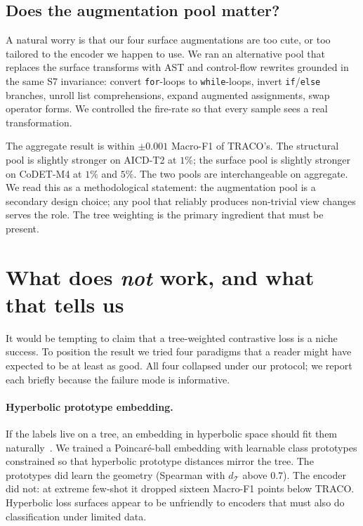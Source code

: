 ﻿\documentclass[11pt]{article}
\newcommand{\method}{\textsc{TRACO}\xspace}
\begin{document}
\subsection{Does the augmentation pool matter?}
\label{sec:aug-pool}

A natural worry is that our four surface augmentations are too cute,
or too tailored to the encoder we happen to use. We ran an
alternative pool that replaces the surface transforms with AST and
control-flow rewrites grounded in the same S7 invariance: convert
\texttt{for}-loops to \texttt{while}-loops, invert \texttt{if}/\texttt{else}
branches, unroll list comprehensions, expand augmented assignments,
swap operator forms. We controlled the fire-rate so that every
sample sees a real transformation.

The aggregate result is within $\pm 0.001$ Macro-F1 of \method's. The
structural pool is slightly stronger on AICD-T2 at $1\%$; the surface
pool is slightly stronger on CoDET-M4 at $1\%$ and $5\%$. The two
pools are interchangeable on aggregate. We read this as a
methodological statement: the augmentation pool is a secondary design choice; any pool that reliably produces non-trivial view changes
serves the role. The tree weighting is the primary ingredient that must be present.

\section{What does \emph{not} work, and what that tells us}
\label{sec:negative}

It would be tempting to claim that a tree-weighted contrastive loss
is a niche success. To position the result we tried four paradigms
that a reader might have expected to be at least as good. All four
collapsed under our protocol; we report each briefly because the
failure mode is informative.

\paragraph{Hyperbolic prototype embedding.} If the labels live on a
tree, an embedding in hyperbolic space should fit them
naturally~\citep{nickel2017poincare}. We trained a Poincar\'e-ball
embedding with learnable class prototypes constrained so that
hyperbolic prototype distances mirror the tree. The prototypes did
learn the geometry (Spearman with $d_{\mathcal{T}}$ above $0.7$).
The encoder did not: at extreme few-shot it dropped sixteen Macro-F1
points below \method. Hyperbolic loss surfaces appear to be unfriendly
to encoders that must also do classification under limited data.
\end{document}
